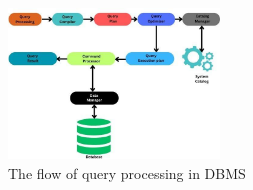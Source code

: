 \begin{figure}[h]
    \centering
    
    \includegraphics[width=0.5\textwidth]{Figure/Flow of QueryProcessing.jpg }
    \caption[The flow of query processing in DBMS]{The flow of query processing in DBMS ~\cite{wwwnaukricom-no-date} }
     
    \label{fig:my_image} 
\end{figure}
